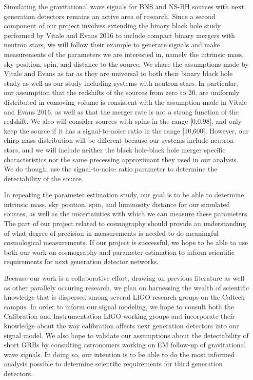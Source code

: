 \documentclass{article}
\begin{document}
Simulating the gravitational wave signals for BNS and NS-BH sources with next generation detectors remains an active area of research.  Since a second component of our project involves extending the binary black hole study performed by Vitale and Evans 2016 to include compact binary mergers with neutron stars, we will follow their example to generate signals and make measurements of the parameters we are interested in, namely the intrinsic mass, sky position, spin, and distance to the source.  We share the assumptions made by Vitale and Evans as far as they are universal to both their binary black hole study as well as our study including systems with neutron stars.  In particular, our assumption that the redshifts of the sources from zero to 20, are uniformly distributed in comoving volume is consistent with the assumption made in Vitale and Evans 2016, as well as that the merger rate is not a strong function of the redshift.  We also will consider sources with spins in the range [0,0.98], and only keep the source if it has a signal-to-noise ratio in the range [10,600].  However, our chirp mass distribution will be different because our systems include neutron stars, and we will include neither the black hole-black hole merger specific characteristics nor the same precessing approximant they used in our analysis.  We do though, use the signal-to-noise ratio parameter to determine the detectability of the source.

In repeating the parameter estimation study, our goal is to be able to determine intrinsic mass, sky position, spin, and luminosity distance for our simulated sources, as well as the uncertainties with which we can measure these parameters.  The part of our project related to cosmography should provide an understanding of what degree of precision in measurements is needed to do meaningful cosmological measurements.  If our project is successful, we hope to be able to use both our work on cosmography and parameter estimation to inform scientific requirements for next generation detector networks.

Because our work is a collaborative effort, drawing on previous literature as well as other parallely occuring research, we plan on harnessing the wealth of scientific knowledge that is dispersed among several LIGO research groups on the Caltech campus.  In order to inform our signal modeling, we hope to consult both the Calibration and Instrumentation LIGO working  groups and incorporate their knowledge about the way calibration affects next generation detectors into our signal model.  We also hope to validate our assumptions about the detectability of short GRBs by consulting astronomers working on EM follow-up of gravitational wave signals.  In doing so, our intention is to be able to do the most informed analysis possible to determine scientific requirements for third generation detectors.   
\end{document}
